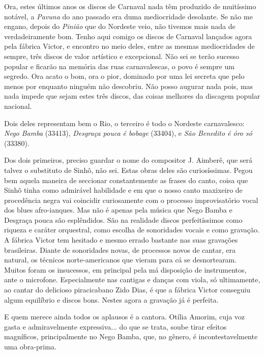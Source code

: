 Ora, estes últimos anos os discos de Carnaval nada têm produzido de
muitíssimo notável, a \emph{Pavuna} do ano passado era duma mediocridade
desolante. Se não me engano, depois do \emph{Pinião} que do Nordeste
veio, não tivemos mais nada de verdadeiramente bom. Tenho aqui comigo os
discos de Carnaval lançados agora pela fábrica Victor, e encontro no
meio deles, entre as mesmas mediocridades de sempre, três discos de
valor artístico e excepcional. Não sei se terão sucesso popular e
ficarão na memória das ruas carnavalescas, o povo é sempre um segredo.
Ora acato o bom, ora o pior, dominado por uma lei secreta que pelo menos
por enquanto ninguém não descobriu. Não posso augurar nada pois, mas
nada impede que sejam estes três discos, das coisas melhores da discagem
popular nacional.

Dois deles representam bem o Rio, o terceiro é todo o Nordeste
carnavalesco: \emph{Nego Bamba} (33413), \emph{Desgraça pouca é bobage}
(33404), e \emph{São Benedito é óro só} (33380).

Dos dois primeiros, preciso guardar o nome do compositor J. Aimberê, que
será talvez o substituto de Sinhô, não sei. Estas obras deles são
curiosíssimas. Pegou bem aquela maneira de seccionar constantemente as
frases do canto, coisa que Sinhô tinha como admirável habilidade e em
que o nosso canto maxixeiro de procedência negra vai coincidir
curiosamente com o processo improvisatório vocal dos blues afro-ianques.
Mas não é apenas pela música que Nego Bamba e Desgraça pouca são
esplêndidos. São na realidade discos perfeitíssimos como riqueza e
caráter orquestral, como escolha de sonoridades vocais e como gravação.
A fábrica Victor tem hesitado e mesmo errado bastante nas suas gravações
brasileiras. Diante de sonoridades novas, de processos novos de cantar,
era natural, os técnicos norte-americanos que vieram para cá se
desnortearam. Muitos foram os insucessos, em principal pela má
disposição de instrumentos, ante o microfone. Especialmente nas cantigas
e danças com viola, só ultimamente, ao cantar do delicioso piracicabano
Zido Dias, é que a fábrica Victor conseguiu algum equilíbrio e discos
bons. Nestes agora a gravação já é perfeita.

E quem merece ainda todos os aplausos é a cantora. Otília Amorim, cuja
voz gasta e admiravelmente expressiva... do que se trata, soube tirar
efeitos magníficos, principalmente no Nego Bamba, que, no gênero, é
incontestavelmente uma obra-prima.

